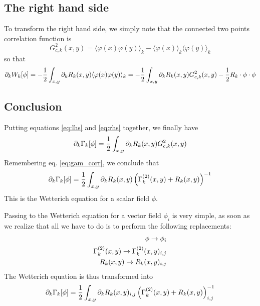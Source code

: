 \subsection{The right hand side}
To transform the right hand side, we simply note that the connected two points correlation function is
\begin{equation}
G_{c,k}^{2}(x,y) = \langle \varphi(x) \varphi(y) \rangle_k - \langle \varphi(x) \rangle_k \langle \varphi(y) \rangle_k
\end{equation}
so that
\begin{equation}
\label{eq:rhs}
\partial_{k} W_k[\phi] = -\frac{1}{2} \int_{x,y} \partial_{k} R_k(x,y) \langle \varphi(x) \varphi(y) \rangle_k = -\frac{1}{2} \int_{x,y} \partial_{k} R_k(x,y) G_{c,k}^2(x,y) - \frac{1}{2} R_k \cdot \phi \cdot \phi
\end{equation}

\subsection{Conclusion}
Putting equations \ref{eq:lhs} and \ref{eq:rhs} together, we finally have
\begin{equation}
\partial_{k} \Gamma_k[\phi] = \frac{1}{2} \int_{x,y} \partial_{k} R_k(x,y) G_{c,k}^2(x,y)
\end{equation}
Remembering eq. \ref{eq:gam_corr}, we conclude that
\begin{equation}
\partial_{k} \Gamma_k[\phi] = \frac{1}{2} \int_{x,y} \partial_{k} R_k(x,y) \left( \Gamma_k^{(2)}(x,y) + R_k(x,y) \right)^{-1}
\end{equation}
This is the Wetterich equation for a scalar field $\phi$.

Passing to the Wetterich equation for a vector field $\phi_i$ is very simple, as soon as we realize that all we have to do is to perform the following replacements:
\begin{align}
\phi \rightarrow \phi_i \\
\Gamma_k^{(2)}(x,y) \rightarrow \Gamma_k^{(2)}(x,y)_{i,j} \\
R_k(x,y) \rightarrow R_k(x,y)_{i,j}
\end{align}
The Wetterich equation is thus transformed into
\begin{equation}
\partial_{k} \Gamma_k[\phi] = \frac{1}{2} \int_{x,y} \partial_{k} R_k(x,y)_{i,j} \left( \Gamma_k^{(2)}(x,y) + R_k(x,y) \right)^{-1}_{i,j}
\end{equation}